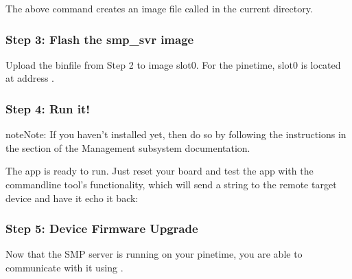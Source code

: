 \documentclass[letterpaper,10pt,english]{sphinxmanual}
\begin{document}
The above command creates an image file called  in the
current directory.


\subsubsection{Step 3: Flash the smp\_svr image}
\label{\detokenize{fota/smp_svr:step-3-flash-the-smp-svr-image}}
Upload the bin\sphinxhyphen{}file from Step 2 to image slot\sphinxhyphen{}0.
For the pinetime, slot\sphinxhyphen{}0 is located at address .

\begin{sphinxVerbatim}[commandchars=\\\{\}]
\end{sphinxVerbatim}


\subsubsection{Step 4: Run it!}
\label{\detokenize{fota/smp_svr:step-4-run-it}}
\begin{sphinxadmonition}{note}{Note:}
If you haven’t installed  yet, then do so by following the
instructions in the  section of the Management subsystem
documentation.
\end{sphinxadmonition}

The  app is ready to run.  Just reset your board and test the app
with the  command\sphinxhyphen{}line tool’s  functionality, which will
send a string to the remote target device and have it echo it back:

\begin{sphinxVerbatim}[commandchars=\\\{\}]
\end{sphinxVerbatim}


\subsubsection{Step 5: Device Firmware Upgrade}
\label{\detokenize{fota/smp_svr:step-5-device-firmware-upgrade}}
Now that the SMP server is running on your pinetime, you are able to communicate
with it using .
\end{document}
